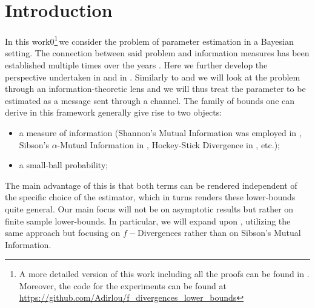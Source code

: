 \documentclass[conference]{IEEEtran}
\theoremstyle{plain}
\theoremstyle{definition}
\theoremstyle{remark}
\def\arxiv{1}
\begin{document}
\section{Introduction}
In this work\if\arxiv0\footnote{A more detailed version of this work including all the proofs can be found in \cite{arxiv_version_of_this_paper}. Moreover, the code for the experiments can be found at \url{https://github.com/Adirlou/f\_divergences\_lower\_bounds}}\fi \,we consider the problem of parameter estimation in a Bayesian setting.
The connection between said problem and information measures has been established multiple times over the years \cite{zhang,bayesRiskRaginsky,CalmonSDPIHockeyStick}.
Here we further develop the perspective undertaken in \cite{bayesRiskRaginsky} and in \cite{bayesRiskIalpha}.
Similarly to \cite{bayesRiskRaginsky} and \cite{bayesRiskIalpha} we will look at the problem through an information-theoretic lens and we will thus treat the parameter to be estimated as a message sent through a channel. The family of bounds one can derive in this framework generally give rise to two objects:
\begin{itemize}
    \item a measure of information (Shannon's Mutual Information was employed in \cite{bayesRiskRaginsky}, Sibson's $\alpha$-Mutual Information in \cite{bayesRiskIalpha}, Hockey-Stick Divergence in \cite{CalmonSDPIHockeyStick}, etc.);
    \item a small-ball probability;
\end{itemize}
The main advantage of this is that both terms can be rendered independent of the specific choice of the estimator, which in turns renders these lower-bounds quite general.
Our main focus will not be on asymptotic results but rather on finite sample lower-bounds. In particular, we will expand upon \cite{bayesRiskIalpha}, utilizing the same approach but focusing on $f-$Divergences rather than on Sibson's Mutual Information.
\end{document}

